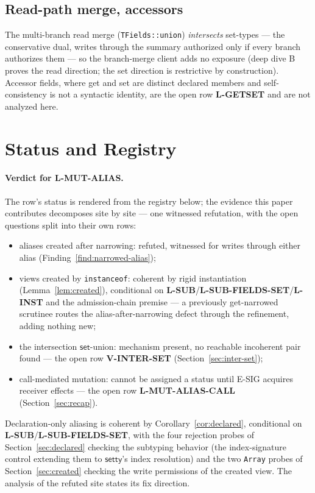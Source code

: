 \documentclass[11pt]{article}
\newcommand{\setty}{\mathsf{setty}}
\begin{document}
\subsection{Read-path merge, accessors}
\label{sec:rest}

The multi-branch read merge (\texttt{TFields::union}) \emph{intersects}
set-types — the conservative dual, writes through the summary authorized
only if every branch authorizes them — so the branch-merge client adds
no exposure (deep dive B proves the read direction; the set direction is
restrictive by construction). Accessor fields, where get and set are
distinct declared members and self-consistency is not a syntactic
identity, are the open row \textbf{L-GETSET} and are not analyzed here.

\section{Status and Registry}
\label{sec:status}

\paragraph{Verdict for L-MUT-ALIAS.} The row's status is rendered from
the registry below; the evidence this paper contributes decomposes site
by site — one witnessed refutation, with the open questions split into
their own rows:
\begin{itemize}
\item aliases created after narrowing: refuted, witnessed for writes through either alias
  (Finding~\ref{find:narrowed-alias});
\item views created by \texttt{instanceof}: coherent by rigid
  instantiation (Lemma~\ref{lem:created}), conditional on
  \textbf{L-SUB}/\textbf{L-SUB-FIELDS-SET}/\textbf{L-INST} and the
  admission-chain premise — a previously get-narrowed scrutinee routes
  the alias-after-narrowing defect through the refinement, adding nothing new;
\item the intersection $\mathsf{set}$-union: mechanism present, no
  reachable incoherent pair found — the open row \textbf{V-INTER-SET}
  (Section~\ref{sec:inter-set});
\item call-mediated mutation: cannot be assigned a status until E-SIG
  acquires receiver effects — the open row \textbf{L-MUT-ALIAS-CALL}
  (Section~\ref{sec:recap}).
\end{itemize}
Declaration-only aliasing is coherent by Corollary~\ref{cor:declared},
conditional on \textbf{L-SUB}/\textbf{L-SUB-FIELDS-SET}, with the four
rejection probes of Section~\ref{sec:declared} checking the subtyping
behavior (the index-signature control extending them to $\setty$'s
index resolution) and the two \texttt{Array} probes of
Section~\ref{sec:created} checking the write permissions of the created
view. The analysis of the refuted site states its fix direction.
\end{document}
